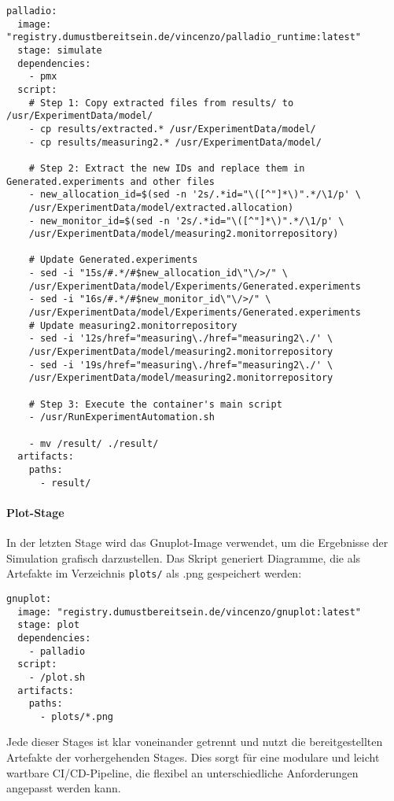 \begin{verbatim}
palladio:
  image: "registry.dumustbereitsein.de/vincenzo/palladio_runtime:latest"
  stage: simulate
  dependencies:
    - pmx
  script:
    # Step 1: Copy extracted files from results/ to /usr/ExperimentData/model/
    - cp results/extracted.* /usr/ExperimentData/model/
    - cp results/measuring2.* /usr/ExperimentData/model/

    # Step 2: Extract the new IDs and replace them in Generated.experiments and other files
    - new_allocation_id=$(sed -n '2s/.*id="\([^"]*\)".*/\1/p' \
    /usr/ExperimentData/model/extracted.allocation)
    - new_monitor_id=$(sed -n '2s/.*id="\([^"]*\)".*/\1/p' \
    /usr/ExperimentData/model/measuring2.monitorrepository)

    # Update Generated.experiments
    - sed -i "15s/#.*/#$new_allocation_id\"\/>/" \
    /usr/ExperimentData/model/Experiments/Generated.experiments
    - sed -i "16s/#.*/#$new_monitor_id\"\/>/" \
    /usr/ExperimentData/model/Experiments/Generated.experiments
    # Update measuring2.monitorrepository
    - sed -i '12s/href="measuring\./href="measuring2\./' \
    /usr/ExperimentData/model/measuring2.monitorrepository
    - sed -i '19s/href="measuring\./href="measuring2\./' \
    /usr/ExperimentData/model/measuring2.monitorrepository

    # Step 3: Execute the container's main script
    - /usr/RunExperimentAutomation.sh

    - mv /result/ ./result/
  artifacts:
    paths:
      - result/
\end{verbatim}

\paragraph*{Plot-Stage}
In der letzten Stage wird das Gnuplot-Image verwendet, um die Ergebnisse der Simulation grafisch darzustellen. Das Skript generiert Diagramme, die als Artefakte im Verzeichnis \texttt{plots/} als .png gespeichert werden:

\begin{verbatim}
gnuplot:
  image: "registry.dumustbereitsein.de/vincenzo/gnuplot:latest"
  stage: plot
  dependencies:
    - palladio
  script:
    - /plot.sh
  artifacts:
    paths:
      - plots/*.png
\end{verbatim}

Jede dieser Stages ist klar voneinander getrennt und nutzt die bereitgestellten Artefakte der vorhergehenden Stages. Dies sorgt für eine modulare und leicht wartbare CI/CD-Pipeline, die flexibel an unterschiedliche Anforderungen angepasst werden kann.

